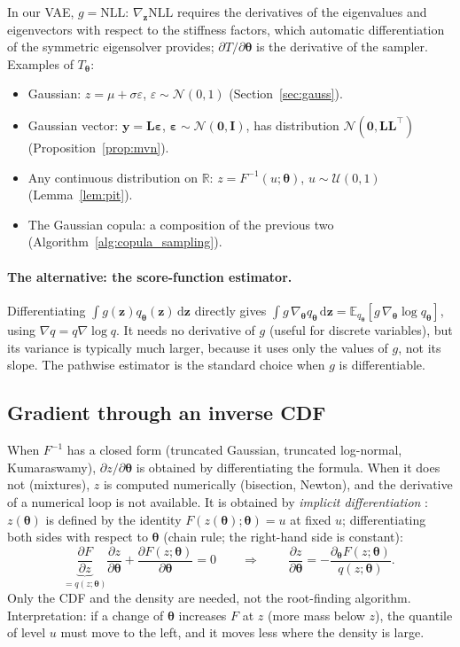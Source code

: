 \documentclass[11pt,a4paper]{article}
\numberwithin{equation}{section}
\theoremstyle{plain}
\theoremstyle{definition}
\theoremstyle{remark}
\newcommand{\z}{\mathbf{z}}
\newcommand{\y}{\mathbf{y}}
\newcommand{\eps}{\bm{\varepsilon}}
\newcommand{\thetab}{\bm{\theta}}
\newcommand{\Lb}{\mathbf{L}}
\newcommand{\I}{\mathbf{I}}
\newcommand{\E}{\mathbb{E}}
\newcommand{\R}{\mathbb{R}}
\newcommand{\NLL}{\mathrm{NLL}}
\newcommand{\N}{\mathcal{N}}
\newcommand{\U}{\mathcal{U}}
\newcommand{\dd}{\,\mathrm{d}}
\newcommand{\qth}{q_{\bm{\theta}}}
\begin{document}
In our VAE, $g=\NLL$: $\nabla_{\z}\NLL$ requires the derivatives of the eigenvalues and eigenvectors with respect to the stiffness factors, which automatic differentiation of the symmetric eigensolver provides; $\partial T/\partial\thetab$ is the derivative of the sampler. Examples of $T_{\thetab}$:
\begin{itemize}
\item Gaussian: $z=\mu+\sigma\varepsilon$, $\varepsilon\sim\N(0,1)$ (Section~\ref{sec:gauss}).
\item Gaussian vector: $\y=\Lb\eps$, $\eps\sim\N(\mathbf0,\I)$, has distribution $\N(\mathbf0,\Lb\Lb^\top)$ (Proposition~\ref{prop:mvn}).
\item Any continuous distribution on $\R$: $z=F^{-1}(u;\thetab)$, $u\sim\U(0,1)$ (Lemma~\ref{lem:pit}).
\item The Gaussian copula: a composition of the previous two (Algorithm~\ref{alg:copula_sampling}).
\end{itemize}

\paragraph{The alternative: the score-function estimator.} Differentiating $\int g(\z)\qth(\z)\dd\z$ directly gives $\int g\,\nabla_{\thetab}\qth\dd\z=\E_{\qth}[g\,\nabla_{\thetab}\log\qth]$, using $\nabla q=q\nabla\log q$. It needs no derivative of $g$ (useful for discrete variables), but its variance is typically much larger, because it uses only the values of $g$, not its slope. The pathwise estimator is the standard choice when $g$ is differentiable.

\subsection{Gradient through an inverse CDF}
\label{sec:implicit}
When $F^{-1}$ has a closed form (truncated Gaussian, truncated log-normal, Kumaraswamy), $\partial z/\partial\thetab$ is obtained by differentiating the formula. When it does not (mixtures), $z$ is computed numerically (bisection, Newton), and the derivative of a numerical loop is not available. It is obtained by \emph{implicit differentiation} \cite{figurnov2018implicit}: $z(\thetab)$ is defined by the identity $F(z(\thetab);\thetab)=u$ at fixed $u$; differentiating both sides with respect to $\thetab$ (chain rule; the right-hand side is constant):
\begin{equation}
\underbrace{\frac{\partial F}{\partial z}}_{=q(z;\thetab)}\frac{\partial z}{\partial\thetab}+\frac{\partial F(z;\thetab)}{\partial\thetab}=0
\qquad\Longrightarrow\qquad
\boxed{\ \frac{\partial z}{\partial\thetab}=-\frac{\partial_{\thetab}F(z;\thetab)}{q(z;\thetab)}.\ }
\label{eq:implicit_grad}
\end{equation}
Only the CDF and the density are needed, not the root-finding algorithm. Interpretation: if a change of $\thetab$ increases $F$ at $z$ (more mass below $z$), the quantile of level $u$ must move to the left, and it moves less where the density is large.
\end{document}
